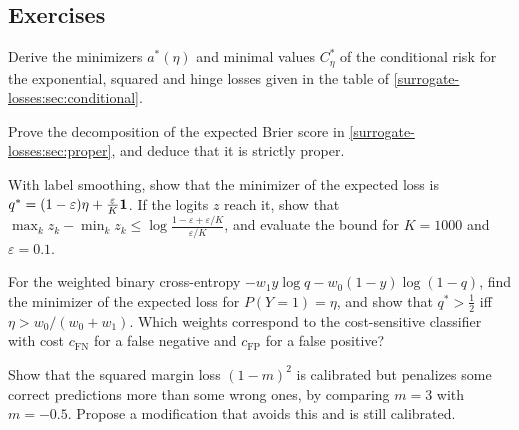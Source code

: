 \begin{notechapter}
\section*{Exercises}

\begin{exercise}\label{surrogate-losses:exr:1}
Derive the minimizers $a^*(\eta)$ and minimal values $C^*_\eta$ of the conditional risk for the
exponential, squared and hinge losses given in the table of
\cref{surrogate-losses:sec:conditional}.
\end{exercise}

\begin{exercise}\label{surrogate-losses:exr:2}
Prove the decomposition of the expected Brier score in \cref{surrogate-losses:sec:proper}, and
deduce that it is strictly proper.
\end{exercise}

\begin{exercise}\label{surrogate-losses:exr:3}
With label smoothing, show that the minimizer of the expected loss is
$q^* = (1 - \varepsilon)\eta + \frac\varepsilon K\mathbf{1}$. If the logits $z$ reach it, show that $\max_kz_k - \min_kz_k\leq\log\frac{1 - \varepsilon + \varepsilon/K}{\varepsilon/K}$, and
evaluate the bound for $K = 1000$ and $\varepsilon = 0.1$.
\end{exercise}

\begin{exercise}\label{surrogate-losses:exr:4}
For the weighted binary cross-entropy $-w_1y\log q - w_0(1 - y)\log(1 - q)$, find the minimizer of the
expected loss for $P(Y = 1) = \eta$, and show that $q^*>\frac12$ iff $\eta>w_0/(w_0 + w_1)$. Which weights
correspond to the cost-sensitive classifier with cost $c_{\mathrm{FN}}$ for a false negative and
$c_{\mathrm{FP}}$ for a false positive?
\end{exercise}

\begin{exercise}\label{surrogate-losses:exr:5}
Show that the squared margin loss $(1 - m)^2$ is calibrated but penalizes some correct
predictions more than some wrong ones, by comparing $m = 3$ with $m = -0.5$. Propose a
modification that avoids this and is still calibrated.
\end{exercise}
\end{notechapter}
